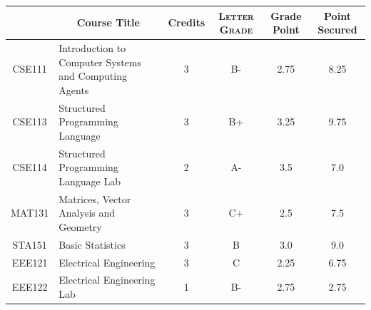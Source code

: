 \documentclass[11pt]{article}
\newcommand*{\numtwo}[1]{\pgfmathprintnumber[
                    fixed, precision=2, fixed zerofill=true]{#1}}
\begin{document}
                \begin{center}
                    \renewcommand{\arraystretch}{1.08}
                    
                \begin{tabular}{|c|l|c|>{\scshape}c|c|c|}
                \hline  \rule[-1ex]{0pt}{3.5ex} {\centering{\bf Course Code}} &  \multicolumn{1}{c|}{\textbf{Course Title}}  & {\bf Credits} & {\bf Letter Grade} & {\bf Grade Point} & {\bf Point Secured}  \\ 
                \hline   CSE111 &  Introduction to Computer Systems and Computing Agents		 & 3 & B- & 2.75 & 8.25 \\ %
                \hline   CSE113 &  Structured Programming Language		 & 3 & B+ & 3.25 & 9.75 \\ %
                \hline   CSE114 &  Structured Programming Language Lab		 & 2 & A- & 3.5 & 7.0 \\ %
                \hline   MAT131 &  Matrices, Vector Analysis and Geometry		 & 3 & C+ & 2.5 & 7.5 \\ %
                \hline   STA151 &  Basic Statistics		 & 3 & B & 3.0 & 9.0 \\ %
                \hline   EEE121 &  Electrical Engineering		 & 3 & C & 2.25 & 6.75 \\ %
                \hline   EEE122 &  Electrical Engineering Lab		 & 1 & B- & 2.75 & 2.75 \\ %

\hline                %
                \end{tabular}
                \end{center}
                \renewcommand{\arraystretch}{1.03}
\end{document}
